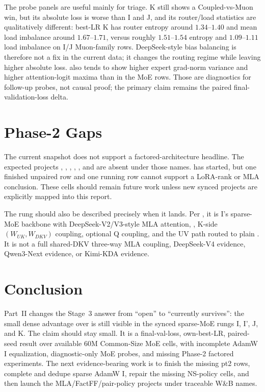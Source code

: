\documentclass[11pt,a4paper]{article}
\begin{document}
The probe panels are useful mainly for triage. K still shows a Coupled-vs-Muon win, but its absolute loss is worse than I and J, and its router/load statistics are qualitatively different: best-LR K has router entropy around $1.34$--$1.40$ and mean load imbalance around $1.67$--$1.71$, versus roughly $1.51$--$1.54$ entropy and $1.09$--$1.11$ load imbalance on I/J Muon-family rows. DeepSeek-style bias balancing is therefore not a fix in the current data; it changes the routing regime while leaving higher absolute loss. \optCoupled{} also tends to show higher expert grad-norm variance and higher attention-logit maxima than \optMuon{} in the MoE rows. Those are diagnostics for follow-up probes, not causal proof; the primary claim remains the paired final-validation-loss delta.

\section{Phase-2 Gaps}

The current snapshot does not support a factored-architecture headline. The expected projects , , , , , and  are absent under those names.  has started, but one finished unpaired \optCoupled{} row and one running row cannot support a LoRA-rank or MLA conclusion. These cells should remain future work unless new synced projects are explicitly mapped into this report.

The  rung should also be described precisely when it lands. Per , it is I's sparse-MoE backbone with DeepSeek-V2/V3-style MLA attention, , K-side $(W_{UK},W_{DKV})$ coupling, optional Q coupling, and the UV path routed to plain \optMuon{}. It is not a full shared-DKV three-way MLA coupling, DeepSeek-V4 evidence, Qwen3-Next evidence, or Kimi-KDA evidence.

\section{Conclusion}

Part~II changes the Stage~3 answer from ``open'' to ``currently survives'': the small dense \optCoupled{} advantage over \optMuon{} is still visible in the synced sparse-MoE rungs I, I', J, and K. The claim should stay small. It is a final-val-loss, own-best-LR, paired-seed result over available 60M Common-Size MoE cells, with incomplete AdamW I equalization, diagnostic-only MoE probes, and missing Phase-2 factored experiments. The next evidence-bearing work is to finish the missing pt2 rows, complete and dedupe sparse AdamW I, repair the missing NS-policy cells, and then launch the MLA/FactFF/pair-policy projects under traceable W\&B names.
\end{document}
